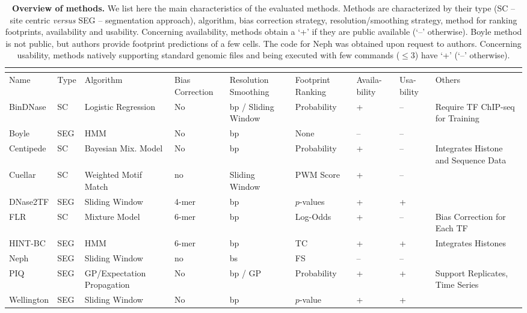 \begin{footnotesize}
\begin{longtable}{p{1.4cm}p{0.6cm}p{1.7cm}p{1.3cm}p{1.6cm}p{1.6cm}p{0.8cm}p{0.8cm}p{2cm}}
\caption[Overview of methods]{\textbf{Overview of methods.} We list here the main characteristics of the evaluated methods. Methods are characterized by their type (SC -- site centric \emph{versus} SEG -- segmentation approach), algorithm, bias correction strategy, resolution/smoothing strategy, method for ranking footprints, availability and usability. Concerning availability, methods obtain a `+' if they are public available (`--' otherwise). Boyle method is not public, but authors provide footprint predictions of a few cells. The code for Neph was obtained upon request to authors. Concerning usability, methods natively supporting standard genomic files and being executed with few commands ($\leq3$) have `+' (`--' otherwise).} \\
\label{tab:overview_methods} \\
  \hline
    Name & Type & Algorithm & Bias Correction & Resolution Smoothing & Footprint Ranking & Availa- bility & Usa- bility & Others\\
  \hline
    BinDNase & SC & Logistic Regression & No & bp / Sliding Window & Probability & + & -- & Require TF ChIP-seq for Training\\
    Boyle & SEG & HMM & No & bp & None & -- & -- & \\
    Centipede & SC & Bayesian Mix. Model & No & bp & Probability & + & -- & Integrates Histone and Sequence Data\\
    Cuellar & SC & Weighted Motif Match & no & Sliding Window & PWM Score & + & -- & \\
    DNase2TF & SEG & Sliding Window & 4-mer & bp & $p$-values & + & + & \\
    FLR & SC & Mixture Model & 6-mer & bp & Log-Odds & + & -- & Bias Correction for Each TF\\
    HINT-BC & SEG & HMM & 6-mer & bp & TC & + & + & Integrates Histones\\
    Neph & SEG & Sliding Window & no & bs & FS & -- & -- & \\
    PIQ & SEG & GP/Expectation Propagation & No & bp / GP & Probability & + & + & Support Replicates, Time Series\\
    Wellington & SEG & Sliding Window & No & bp & $p$-value & + & + & \\
  \hline
\end{longtable}
\end{footnotesize}

